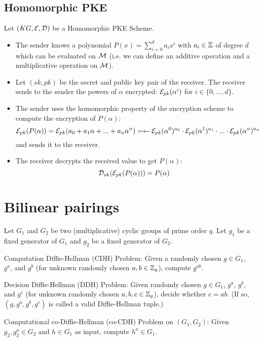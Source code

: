\subsection{Homomorphic PKE}
Let $(KG,\mathcal{E},\mathcal{D})$ be a Homomorphic PKE Scheme.
\begin{itemize}[align = left, leftmargin=*, label={--}]
\item The sender knows a polynomial $P(x) = \sum_{i=0}^d a_i x^i$ with $a_i \in {\mathbb Z}$ of degree $d$ which can be evaluated on $\mathcal{M}$ (i.e. we can define an additive operation and a multiplicative operation on $\mathcal{M}$). 

\item Let $(sk,pk)$ be the secret and public key pair of the receiver. The receiver sends to the sender the powers of $\alpha$ encrypted: $\mathcal{E}_{pk}(\alpha^i)$ for $i \in \{0, ..., d\}$.

\item The sender uses the homomorphic property of the encryption scheme to compute the encryption of $P(\alpha)$: $$\mathcal{E}_{pk}(P(\alpha)) = \mathcal{E}_{pk}(a_0 + a_1 \alpha + ... + a_n \alpha^n) = \leftarrow \mathcal{E}_{pk}(\alpha^0)^{a_0} \cdot \mathcal{E}_{pk}(\alpha^1)^{a_1} \cdot ... \cdot \mathcal{E}_{pk}(\alpha^n)^{a_n}$$
and sends it to the receiver.

\item The receiver decrypts the received value to get $P(\alpha)$:
$$\mathcal{D}_{sk}(\mathcal{E}_{pk}(P(\alpha))) = P(\alpha) $$

\end{itemize}

\section{Bilinear pairings}
\cite{DiHe76}

Let $G_1$ and $G_2$ be two (multiplicative) cyclic groups of prime order $q$. Let $g_1$ be a fixed generator of $G_1$ and $g_2$ be a fixed generator of $G_2$.

 Computation Diffie-Hellman (CDH) Problem: Given a randomly chosen $g \in G_1$, $g^a$, and $g^b$ (for unknown randomly chosen $a,b \in {\mathbb Z}_q$), compute $g^{ab}$.

 Decision Diffie-Hellman (DDH) Problem: Given randomly chosen $g \in G_1$, $g^a$, $g^b$, and $g^c$ (for unknown randomly chosen $a,b,c \in {\mathbb Z}_q$), decide whether $c = ab$. (If so, $(g, g^a, g^b, g^c)$ is called a valid Diffie-Hellman tuple.)

 Computational co-Diffie-Hellman (co-CDH) Problem on $(G_1, G_2)$: Given $g_2, g^a_2 \in G_2$ and $h \in G_1$ as input, compute $h^a \in G_1$.

